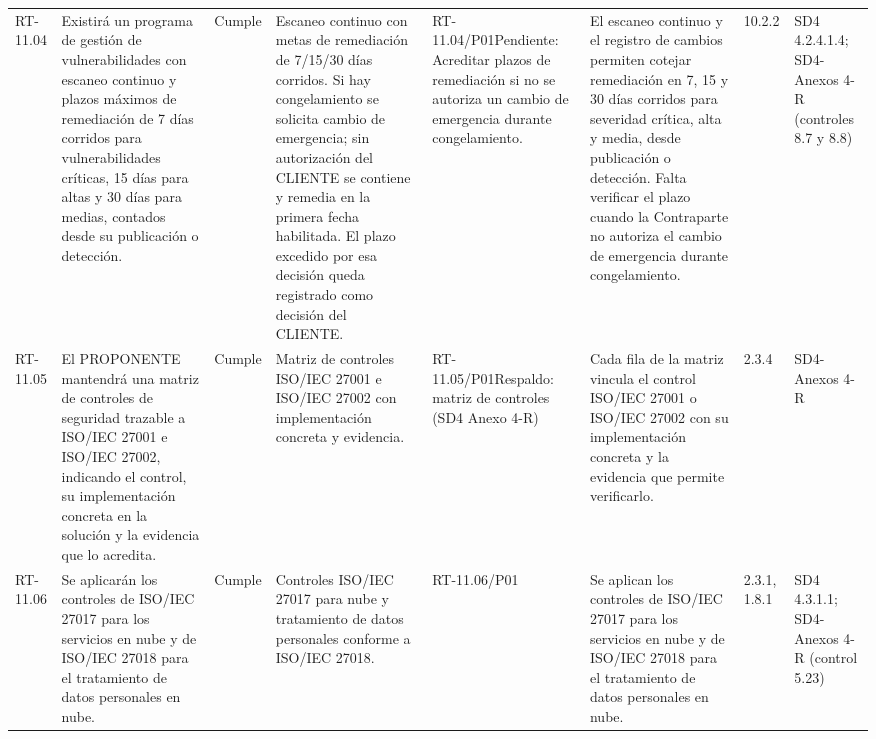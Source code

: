 \documentclass[oficio,firma,final]{lafrox}
\begin{document}
\begin{landscape}
{\begin{longtable}{@{}F{0.054} F{0.173} F{0.061} F{0.191} F{0.106} F{0.180} F{0.067} F{0.168}@{}}
  RT-11.04 & Existirá un programa de gestión de vulnerabilidades con escaneo continuo y plazos máximos de remediación de 7 días corridos para vulnerabilidades críticas, 15 días para altas y 30 días para medias, contados desde su publicación o detección. & Cumple & Escaneo continuo con metas de remediación de 7/15/30 días corridos. Si hay congelamiento se solicita cambio de emergencia; sin autorización del CLIENTE se contiene y remedia en la primera fecha habilitada. El plazo excedido por esa decisión queda registrado como decisión del CLIENTE. & RT-11.04/\allowbreak{}P01\newline Pendiente: Acreditar plazos de remediación si no se autoriza un cambio de emergencia durante congelamiento. & El escaneo continuo y el registro de cambios permiten cotejar remediación en 7, 15 y 30 días corridos para severidad crítica, alta y media, desde publicación o detección. Falta verificar el plazo cuando la Contraparte no autoriza el cambio de emergencia durante congelamiento. & 10.2.2 & SD4 4.2.4.1.4; SD4-Anexos 4-R (controles 8.7 y 8.8) \\
  RT-11.05 & El PROPONENTE mantendrá una matriz de controles de seguridad trazable a ISO/IEC 27001 e ISO/IEC 27002, indicando el control, su implementación concreta en la solución y la evidencia que lo acredita. & Cumple & Matriz de controles ISO/IEC 27001 e ISO/IEC 27002 con implementación concreta y evidencia. & RT-11.05/\allowbreak{}P01\newline Respaldo: matriz de controles (SD4 Anexo 4-R) & Cada fila de la matriz vincula el control ISO/IEC 27001 o ISO/IEC 27002 con su implementación concreta y la evidencia que permite verificarlo. & 2.3.4 & SD4-Anexos 4-R  \\
  RT-11.06 & Se aplicarán los controles de ISO/IEC 27017 para los servicios en nube y de ISO/IEC 27018 para el tratamiento de datos personales en nube. & Cumple & Controles ISO/IEC 27017 para nube y tratamiento de datos personales conforme a ISO/IEC 27018. & RT-11.06/\allowbreak{}P01 & Se aplican los controles de ISO/IEC 27017 para los servicios en nube y de ISO/IEC 27018 para el tratamiento de datos personales en nube. & 2.3.1, 1.8.1 & SD4 4.3.1.1; SD4-Anexos 4-R (control 5.23)  \\

\end{longtable}}
\end{landscape}
\end{document}

